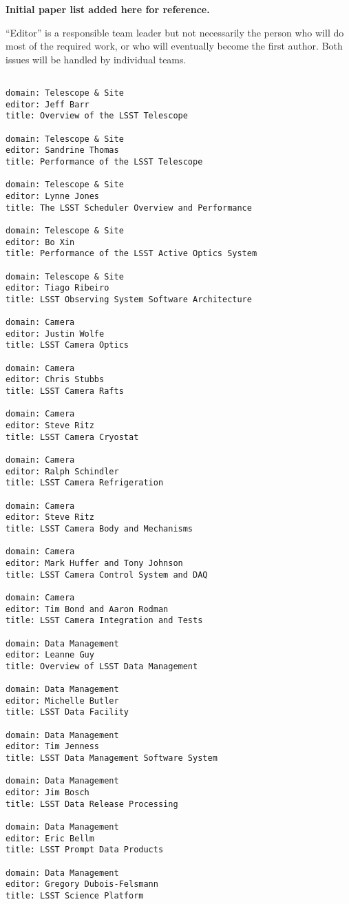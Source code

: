 
{\bf Initial paper list added here for reference.}

``Editor'' is a responsible team leader but not necessarily the person who will do most of
the required work, or who will eventually become the first author. Both issues will be
handled by individual teams.

\begin{verbatim}

domain: Telescope & Site
editor: Jeff Barr
title: Overview of the LSST Telescope

domain: Telescope & Site
editor: Sandrine Thomas
title: Performance of the LSST Telescope

domain: Telescope & Site
editor: Lynne Jones
title: The LSST Scheduler Overview and Performance

domain: Telescope & Site
editor: Bo Xin
title: Performance of the LSST Active Optics System

domain: Telescope & Site
editor: Tiago Ribeiro
title: LSST Observing System Software Architecture

domain: Camera
editor: Justin Wolfe
title: LSST Camera Optics

domain: Camera
editor: Chris Stubbs
title: LSST Camera Rafts

domain: Camera
editor: Steve Ritz
title: LSST Camera Cryostat

domain: Camera
editor: Ralph Schindler
title: LSST Camera Refrigeration

domain: Camera
editor: Steve Ritz
title: LSST Camera Body and Mechanisms

domain: Camera
editor: Mark Huffer and Tony Johnson
title: LSST Camera Control System and DAQ

domain: Camera
editor: Tim Bond and Aaron Rodman
title: LSST Camera Integration and Tests

domain: Data Management
editor: Leanne Guy
title: Overview of LSST Data Management

domain: Data Management
editor: Michelle Butler
title: LSST Data Facility

domain: Data Management
editor: Tim Jenness
title: LSST Data Management Software System

domain: Data Management
editor: Jim Bosch
title: LSST Data Release Processing

domain: Data Management
editor: Eric Bellm
title: LSST Prompt Data Products

domain: Data Management
editor: Gregory Dubois-Felsmann
title: LSST Science Platform


\end{verbatim}

